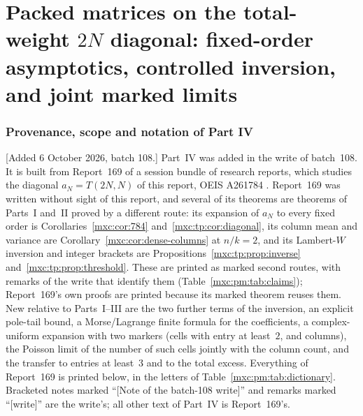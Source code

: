 \documentclass[11pt]{article}
\numberwithin{equation}{section}
\theoremstyle{definition}
\theoremstyle{remark}
\begin{document}
\part{Packed matrices on the total-weight \texorpdfstring{$2N$}{2N} diagonal: fixed-order asymptotics, controlled inversion, and joint marked limits}
\label{mxc:pm:part}

\section{Provenance, scope and notation of Part IV}\label{mxc:pm:sec:front}

[Added 6 October 2026, batch 108.] Part~IV was added in the write of
batch~108. It is built from Report~169 of a session bundle of research
reports, which studies the diagonal $a_N=T(2N,N)$ of this report, OEIS
A261784 \cite{oeis784}. Report~169 was written without sight of this
report, and several of its theorems are theorems of Parts~I and~II proved
by a different route: its expansion of $a_N$ to every fixed order is
Corollaries~\ref{mxc:cor:784} and~\ref{mxc:tp:cor:diagonal}, its column
mean and variance are Corollary~\ref{mxc:cor:dense-columns} at $n/k=2$, and
its Lambert-$W$ inversion and integer brackets are
Propositions~\ref{mxc:tp:prop:inverse} and~\ref{mxc:tp:prop:threshold}.
These are printed as marked second routes, with remarks of the write that
identify them (Table~\ref{mxc:pm:tab:claims}); Report~169's own proofs are
printed because its marked theorem reuses them. New relative to Parts~I--III
are the two further terms of the inversion, an explicit pole-tail bound, a
Morse/Lagrange finite formula for the coefficients, a complex-uniform
expansion with two markers (cells with entry at least~$2$, and columns), the
Poisson limit of the number of such cells jointly with the column count, and
the transfer to entries at least~$3$ and to the total excess.
Everything of Report~169 is printed below, in the letters of
Table~\ref{mxc:pm:tab:dictionary}. Bracketed notes marked ``[Note of the
batch-108 write]'' and remarks marked ``[write]'' are the write's; all other
text of Part~IV is Report~169's.
\end{document}
